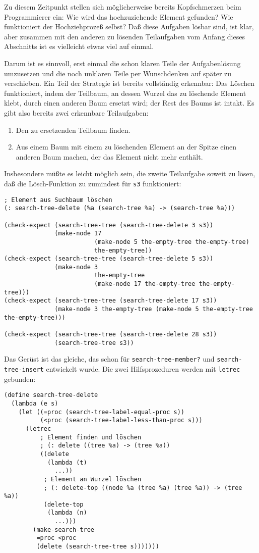 Zu diesem Zeitpunkt stellen sich möglicherweise bereits Kopfschmerzen
beim Programmierer ein: Wie wird das hochzuziehende Element gefunden?
Wie funktioniert der Hochziehprozeß selbst?  Daß diese Aufgaben lösbar
sind, ist klar, aber zusammen mit den anderen zu lösenden Teilaufgaben
vom Anfang dieses Abschnitts ist es vielleicht etwas viel auf einmal.

Darum ist es sinnvoll, erst einmal die schon klaren Teile der
Aufgabenlösung umzusetzen und die noch unklaren Teile per Wunschdenken
auf später zu verschieben.  Ein Teil der Strategie ist bereits
vollständig erkennbar: Das Löschen funktioniert, indem der Teilbaum,
an dessen Wurzel das zu löschende Element klebt, durch einen anderen
Baum ersetzt wird; der Rest des Baums ist intakt.  Es gibt also
bereits zwei erkennbare Teilaufgaben:
%
\begin{enumerate}
\item Den zu ersetzenden Teilbaum finden.
\item Aus einem Baum mit einem zu löschenden Element an der Spitze
  einen anderen Baum machen, der das Element nicht mehr enthält.
\end{enumerate}
%
Insbesondere müßte es leicht möglich sein, die zweite Teilaufgabe
soweit zu lösen, daß die Lösch-Funktion zu zumindest für \texttt{s3}
funktioniert:
%
\begin{verbatim}
; Element aus Suchbaum löschen
(: search-tree-delete (%a (search-tree %a) -> (search-tree %a)))

(check-expect (search-tree-tree (search-tree-delete 3 s3))
              (make-node 17
                         (make-node 5 the-empty-tree the-empty-tree)
                         the-empty-tree))
(check-expect (search-tree-tree (search-tree-delete 5 s3))
              (make-node 3
                         the-empty-tree
                         (make-node 17 the-empty-tree the-empty-tree)))
(check-expect (search-tree-tree (search-tree-delete 17 s3))
              (make-node 3 the-empty-tree (make-node 5 the-empty-tree the-empty-tree)))

(check-expect (search-tree-tree (search-tree-delete 28 s3))
              (search-tree-tree s3))
\end{verbatim}
%
Das Gerüst ist das gleiche, das schon für \texttt{search-tree-member?}
und \texttt{search-tree-insert} entwickelt wurde.  Die zwei
Hilfsprozeduren werden mit \texttt{letrec} gebunden:
%
\begin{verbatim}
(define search-tree-delete
  (lambda (e s)
    (let ((=proc (search-tree-label-equal-proc s))
          (<proc (search-tree-label-less-than-proc s)))
      (letrec
          ; Element finden und löschen
          ; (: delete ((tree %a) -> (tree %a))
          ((delete
            (lambda (t)
              ...))
           ; Element an Wurzel löschen
           ; (: delete-top ((node %a (tree %a) (tree %a)) -> (tree %a))
           (delete-top
            (lambda (n)
              ...)))
        (make-search-tree
         =proc <proc
         (delete (search-tree-tree s)))))))
\end{verbatim}
